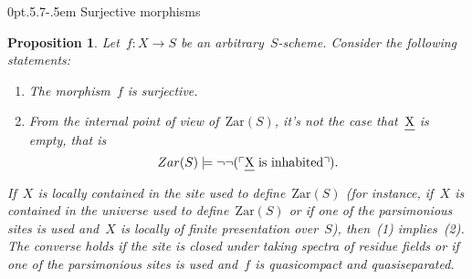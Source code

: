 \documentclass[10pt,reqno,a4paper]{amsbook}
\makeatletter
\theoremstyle{definition}
\theoremstyle{plain}
\newtheorem{prop}[defn]{Proposition}
\theoremstyle{remark}
\let\oldul\ul
\renewcommand{\ul}[1]{\text{\oldul{$#1$}}}
\newcommand{\Zar}{\mathrm{Zar}}
\newcommand{\?}{\,{:}\,}
\renewcommand{\_}{\mathpunct{.}\,}
\newcommand{\speak}[1]{\ulcorner\text{\textnormal{#1}}\urcorner}
\def\subsection{\@startsection{subsection}{2}%
  {0pt}{.5\linespacing\@plus.7\linespacing}{-.5em}%
  {\normalfont\bfseries}}
\makeatother
\begin{document}
\subsection{Surjective morphisms}

\begin{prop}\label{prop:char-surjective-morphisms}
Let~$f : X \to S$ be an arbitrary~$S$-scheme. Consider the following
statements:
\begin{enumerate}
\item The morphism~$f$ is surjective.
\item From the internal point of view of~$\Zar(S)$, it's not the case that~$\ul{X}$ is
empty, that is
\[ Zar(S) \models \neg\neg(\speak{$\ul{X}$ is inhabited}). \]
\end{enumerate}
If~$X$ is locally contained in the site used to define~$\Zar(S)$ (for instance,
if~$X$ is contained in the universe used to define~$\Zar(S)$ or if one of the
parsimonious sites is used and~$X$ is locally of finite presentation over~$S$),
then~(1) implies~(2). The converse holds if the site is closed under
taking spectra of residue fields or if one of the parsimonious sites is used
and~$f$ is quasicompact and quasiseparated.
\end{prop}
\end{document}
